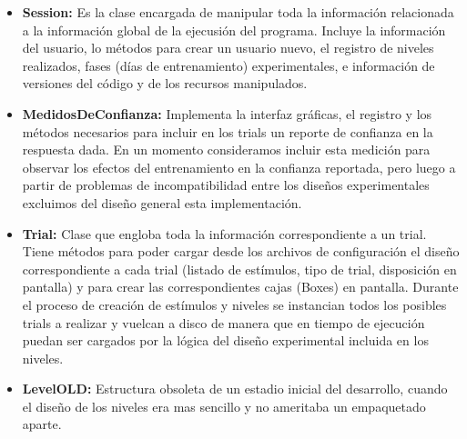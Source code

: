 \documentclass{article}
\numberwithin{figure}{section}
\begin{document}
\begin{itemize}
\begin{itemize}
            \item \textbf{Session:} Es la clase encargada de manipular toda la información relacionada a la información global de la ejecusión del programa. Incluye la información del usuario, lo métodos para crear un usuario nuevo, el registro de niveles realizados, fases (días de entrenamiento) experimentales, e información de versiones del código y de los recursos manipulados. 
            \item \textbf{MedidosDeConfianza:} Implementa la interfaz gráficas, el registro y los métodos necesarios para incluir en los trials un reporte de confianza en la respuesta dada. En un momento consideramos incluir esta medición para observar los efectos del entrenamiento en la confianza reportada, pero luego a partir de problemas de incompatibilidad entre los diseños experimentales excluimos del diseño general esta implementación. 
            \item \textbf{Trial:} Clase que engloba toda la información correspondiente a un trial. Tiene métodos para poder cargar desde los archivos de configuración el diseño correspondiente a cada trial (listado de estímulos, tipo de trial, disposición en pantalla) y para crear las correspondientes cajas (Boxes) en pantalla. Durante el proceso de creación de estímulos y niveles se instancian todos los posibles trials a realizar y vuelcan a disco de manera que en tiempo de ejecución puedan ser cargados por la lógica del diseño experimental incluida en los niveles.
            \item \textbf{LevelOLD:} Estructura obsoleta de un estadio inicial del desarrollo, cuando el diseño de los niveles era mas sencillo y no ameritaba un empaquetado aparte. 
            
        \end{itemize}
        

\end{itemize}
\end{document}
